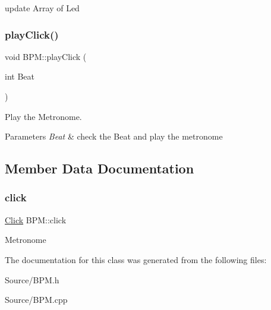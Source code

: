 update Array of Led \mbox{\label{class_b_p_m_abdf9b80178cc39fe591a653f1fa685ba}} 
\subsubsection{\texorpdfstring{playClick()}{playClick()}}
{\footnotesize\ttfamily void B\+P\+M\+::play\+Click (\begin{DoxyParamCaption}\item[{int}]{Beat }\end{DoxyParamCaption})}

Play the Metronome. 
\begin{DoxyParams}{Parameters}
{\em Beat} & check the Beat and play the metronome \\
\hline
\end{DoxyParams}


\subsection{Member Data Documentation}
\mbox{\label{class_b_p_m_a4663b64aa536da31f5cb6d414a3d36ff}} 
\subsubsection{\texorpdfstring{click}{click}}
{\footnotesize\ttfamily \mbox{\hyperlink{class_click}{Click}} B\+P\+M\+::click}

Metronome 

The documentation for this class was generated from the following files\+:\begin{DoxyCompactItemize}
\item 
Source/B\+P\+M.\+h\item 
Source/B\+P\+M.\+cpp\end{DoxyCompactItemize}
